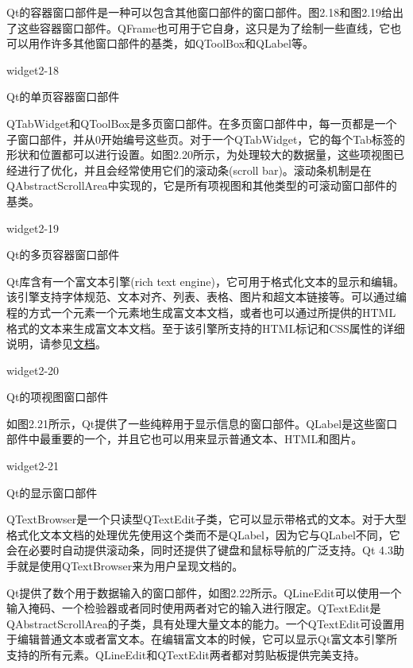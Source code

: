 \documentclass[11pt,oneside]{book}
\begin{document}
\begin{common-format}
Qt的容器窗口部件是一种可以包含其他窗口部件的窗口部件。图2.18和图2.19给出了这些容器窗口部件。QFrame也可用于它自身，这只是为了绘制一些直线，它也可以用作许多其他窗口部件的基类，如QToolBox和QLabel等。
\begin{linefig}[0.8]{widget2-18}
\caption{Qt的单页容器窗口部件}
\label{fig:widget2-18}
\end{linefig}

QTabWidget和QToolBox是多页窗口部件。在多页窗口部件中，每一页都是一个子窗口部件，并从0开始编号这些页。对于一个QTabWidget，它的每个Tab标签的形状和位置都可以进行设置。如图2.20所示，为处理较大的数据量，这些项视图已经进行了优化，并且会经常使用它们的滚动条(scroll bar)。滚动条机制是在QAbstractScrollArea中实现的，它是所有项视图和其他类型的可滚动窗口部件的基类。 

\begin{linefig}[0.8]{widget2-19}
\caption{Qt的多页容器窗口部件}
\label{fig:widget2-19}
\end{linefig}


Qt库含有一个富文本引擎(rich text engine)，它可用于格式化文本的显示和编辑。该引擎支持字体规范、文本对齐、列表、表格、图片和超文本链接等。可以通过编程的方式一个元素一个元素地生成富文本文档，或者也可以通过所提供的HTML格式的文本来生成富文本文档。至于该引擎所支持的HTML标记和CSS属性的详细说明，请参见\href{http://doc.trolltech.com/4.3/richtext-html-subset.html}{文档}。

\begin{linefig}[0.8]{widget2-20}
\caption{Qt的项视图窗口部件}
\label{fig:widget2-20}
\end{linefig}

如图2.21所示，Qt提供了一些纯粹用于显示信息的窗口部件。QLabel是这些窗口部件中最重要的一个，并且它也可以用来显示普通文本、HTML和图片。

\begin{linefig}[0.8]{widget2-21}
\caption{Qt的显示窗口部件}
\label{fig:widget2-21}
\end{linefig}

QTextBrowser是一个只读型QTextEdit子类，它可以显示带格式的文本。对于大型格式化文本文档的处理优先使用这个类而不是QLabel，因为它与QLabel不同，它会在必要时自动提供滚动条，同时还提供了键盘和鼠标导航的广泛支持。Qt 4.3助手就是使用QTextBrowser来为用户呈现文档的。

Qt提供了数个用于数据输入的窗口部件，如图2.22所示。QLineEdit可以使用一个输入掩码、一个检验器或者同时使用两者对它的输入进行限定。QTextEdit是QAbstractScrollArea的子类，具有处理大量文本的能力。一个QTextEdit可设置用于编辑普通文本或者富文本。在编辑富文本的时候，它可以显示Qt富文本引擎所支持的所有元素。QLineEdit和QTextEdit两者都对剪贴板提供完美支持。


\end{common-format}
\end{document}
